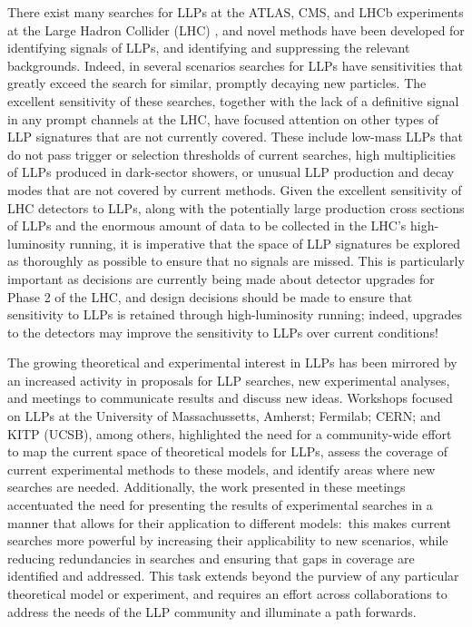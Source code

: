 There exist many searches for LLPs at the ATLAS, CMS, and LHCb experiments at the Large Hadron Collider (LHC) \cite{another-massive-cite-dump}, and novel methods have been developed for identifying signals of LLPs, and identifying and suppressing the relevant backgrounds. Indeed, in several scenarios searches for LLPs have sensitivities that greatly exceed the search for similar, promptly decaying new particles. The excellent sensitivity of these searches, together with the lack of a definitive signal in any prompt channels at the LHC, have focused attention on other types of LLP signatures that are not currently covered. These include low-mass LLPs that do not pass trigger or selection thresholds of current searches, high multiplicities of LLPs produced in dark-sector showers, or unusual LLP production and decay modes that are not covered by current methods. Given the excellent  sensitivity of LHC detectors to LLPs, along with the potentially large production cross sections of LLPs and the enormous amount of data to be collected in the LHC's high-luminosity running, it is imperative that the space of LLP signatures be explored as thoroughly as possible to ensure that no signals are missed. This is particularly important as decisions are currently being made about detector upgrades for Phase 2 of the LHC, and design decisions should be made to ensure that sensitivity to LLPs is retained through high-luminosity running; indeed, upgrades to the detectors may improve the sensitivity to LLPs over current conditions!

The growing theoretical and experimental interest in LLPs has been mirrored by an increased activity in proposals for LLP searches, new experimental analyses, and meetings to communicate results and discuss new ideas. Workshops focused on LLPs at the University of Massachussetts, Amherst; Fermilab; CERN; and KITP (UCSB), among others, highlighted the need for a community-wide effort to map the current space of theoretical models for LLPs, assess the coverage of current experimental methods to these models, and identify areas where new searches are needed. Additionally, the work presented in these meetings accentuated the need for presenting the results of experimental searches in a manner that allows for their application to different models:~this makes current searches more powerful by increasing their applicability to new scenarios, while reducing redundancies in searches and ensuring that gaps in coverage are identified and addressed. This task extends beyond the purview of any particular theoretical model or experiment, and requires an effort across collaborations to address the needs of the LLP community and illuminate a path forwards. 

